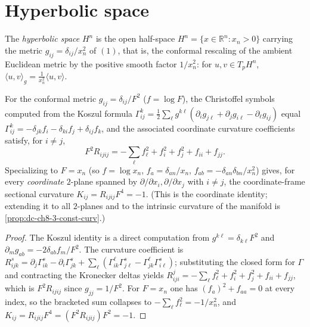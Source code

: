 \section{Hyperbolic space}

\begin{definition}
  \label{def:dc-ch8-3-hyperbolic-space}

  The \emph{hyperbolic space} $H^n$ is the open half-space
  $H^n=\{x\in\mathbb R^n : x_n>0\}$ carrying the metric $g_{ij}=\delta_{ij}/x_n^2$
  of $(1)$, that is, the conformal rescaling of the ambient Euclidean metric by
  the positive smooth factor $1/x_n^2$: for $u,v\in T_pH^n$,
  $\langle u,v\rangle_g=\tfrac{1}{x_n^2}\langle u,v\rangle$.
\end{definition}

\begin{lemma}
  \label{lem:dc-ch8-3-conformal-curvature}


  For the conformal metric $g_{ij}=\delta_{ij}/F^2$ ($f=\log F$), the Christoffel
  symbols computed from the Koszul formula
  $\Gamma^k_{ij}=\tfrac12\sum_\ell g^{k\ell}(\partial_i g_{j\ell}+\partial_j g_{i\ell}-\partial_\ell g_{ij})$
  equal $\Gamma^k_{ij}=-\delta_{jk}f_i-\delta_{ki}f_j+\delta_{ij}f_k$, and the
  associated coordinate curvature coefficients satisfy, for $i\neq j$,
  $$F^2R_{ijij}=-\sum_\ell f_\ell^2+f_i^2+f_j^2+f_{ii}+f_{jj}.$$
  Specializing to $F=x_n$ (so $f=\log x_n$, $f_a=\delta_{an}/x_n$,
  $f_{ab}=-\delta_{an}\delta_{bn}/x_n^2$) gives, for every \emph{coordinate}
  $2$-plane spanned by $\partial/\partial x_i,\partial/\partial x_j$ with $i\neq j$,
  the coordinate-frame sectional curvature $K_{ij}=R_{ijij}F^4=-1$. (This is the
  coordinate identity; extending it to all $2$-planes and to the intrinsic
  curvature of the manifold is \cref{prop:dc-ch8-3-const-curv}.)
\end{lemma}
\begin{proof}

\sketch
  The Koszul identity is a direct computation from
  $g^{k\ell}=\delta_{k\ell}F^2$ and $\partial_m g_{ab}=-2\delta_{ab}f_m/F^2$.
  The curvature coefficient is
  $R^s_{ijk}=\partial_j\Gamma^s_{ik}-\partial_i\Gamma^s_{jk}+\sum_\ell(\Gamma^\ell_{ik}\Gamma^s_{j\ell}-\Gamma^\ell_{jk}\Gamma^s_{i\ell})$;
  substituting the closed form for $\Gamma$ and contracting the Kronecker deltas
  yields $R^j_{iji}=-\sum_\ell f_\ell^2+f_i^2+f_j^2+f_{ii}+f_{jj}$, which is
  $F^2R_{ijij}$ since $g_{jj}=1/F^2$. For $F=x_n$ one has
  $(f_a)^2+f_{aa}=0$ at every index, so the bracketed sum collapses to
  $-\sum_\ell f_\ell^2=-1/x_n^2$, and $K_{ij}=R_{ijij}F^4=(F^2R_{ijij})F^2=-1$.
\end{proof}

